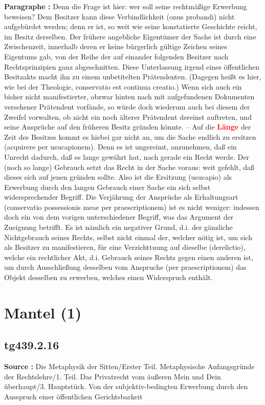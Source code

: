 \documentclass[a4paper,12pt,twoside]{book}
\newcommand{\match}[1]{\textcolor{red}{\textbf{#1}}}
\newcommand{\unnumberedsection}[1]{
	\section*{#1}
	\addcontentsline{toc}{section}{#1}
	\markright{#1}
}
\begin{document}
	\textbf{Paragraphe : }Denn die Frage ist hier: wer soll seine rechtmäßige Erwerbung beweisen? Dem Besitzer kann diese Verbindlichkeit (onus probandi) nicht aufgebürdet werden; denn er ist, so weit wie seine konstatierte Geschichte reicht, im Besitz derselben. Der frühere angebliche Eigentümer der Sache ist durch eine Zwischenzeit, innerhalb deren er keine bürgerlich gültige Zeichen seines Eigentums gab, von der Reihe der auf einander folgenden Besitzer nach Rechtsprinzipien ganz abgeschnitten. Diese Unterlassung irgend eines öffentlichen Besitzakts macht ihn zu einem unbetitelten Prätendenten. (Dagegen heißt es hier, wie bei der Theologie, conservatio est continua creatio.) Wenn sich auch ein bisher nicht manifestierter, obzwar hinten nach mit aufgefundenen Dokumenten versehener Prätendent vorfände, so würde doch wiederum auch bei diesem der Zweifel vorwalten, ob nicht ein noch älterer Prätendent dereinst auftreten, und seine Ansprüche auf den früheren Besitz gründen könnte. – Auf die \match{Länge} der Zeit des Besitzes kommt es hiebei gar nicht an, um die Sache endlich zu ersitzen (acquirere per usucapionem). Denn es ist ungereimt, anzunehmen, daß ein Unrecht dadurch, daß es lange gewährt hat, nach gerade ein Recht werde. Der (noch so lange) Gebrauch setzt das Recht in der Sache voraus: weit gefehlt, daß dieses sich auf jenen gründen sollte. Also ist die Ersitzung (usucapio) als Erwerbung durch den langen Gebrauch einer Sache ein sich selbst widersprechender Begriff. Die Verjährung der Ansprüche als Erhaltungsart (conservatio possessionis meae per praescriptionem) ist es nicht weniger: indessen doch ein von dem vorigen unterschiedener Begriff, was das Argument der Zueignung betrifft. Es ist nämlich ein negativer Grund, d.i. der gänzliche Nichtgebrauch seines Rechts, selbst nicht einmal der, welcher nötig ist, um sich als Besitzer zu manifestieren, für eine Verzichttuung auf dieselbe (derelictio), welche ein rechtlicher Akt, d.i. Gebrauch seines Rechts gegen einen  anderen ist, um durch Ausschließung desselben vom Anspruche (per praescriptionem) das Objekt desselben zu erwerben, welches einen Widerspruch enthält. 
	
	\unnumberedsection{Mantel (1)} 
	\subsection*{tg439.2.16} 
	\textbf{Source : }Die Metaphysik der Sitten/Erster Teil. Metaphysische Anfangsgründe der Rechtslehre/1. Teil. Das Privatrecht vom äußeren Mein und Dein überhaupt/3. Hauptstück. Von der subjektiv-bedingten Erwerbung durch den Ausspruch einer öffentlichen Gerichtsbarkeit\\  
	
\end{document}
